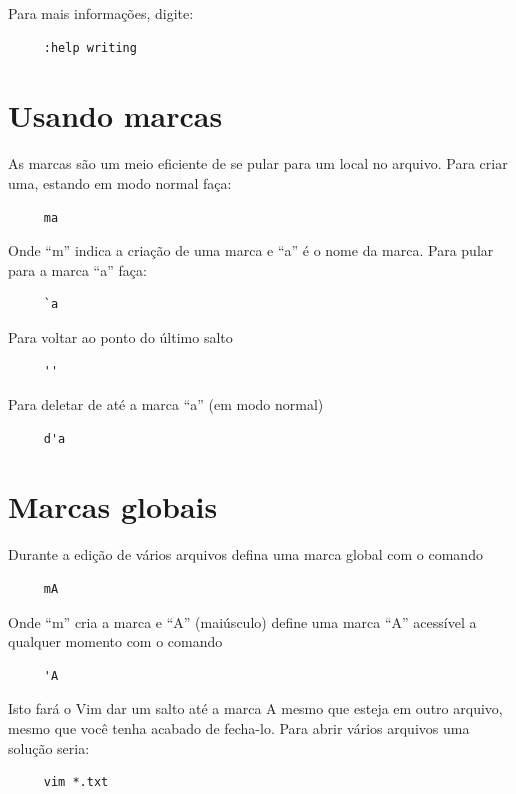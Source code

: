 \documentclass[10pt,a4paper,openany]{book}
\begin{document}
Para mais informações, digite:

\begin{verbatim}
     :help writing
\end{verbatim}

\section{Usando marcas}
\label{sec:Usando marcas}

As marcas são um meio eficiente de se pular para um local no arquivo. Para
criar uma,  estando em modo normal faça:

\begin{verbatim}
     ma
\end{verbatim}

Onde ``m'' indica a criação de uma marca e ``a'' é o nome da marca. Para pular para a marca ``a'' faça:

\begin{verbatim}
     `a
\end{verbatim}

Para voltar ao ponto do último salto

\begin{verbatim}
     ''
\end{verbatim}

Para deletar de até a marca ``a'' (em modo normal)

\begin{verbatim}
     d'a
\end{verbatim}

\section{Marcas globais}
Durante a edição de vários arquivos defina uma marca global com o comando

\begin{verbatim}
     mA
\end{verbatim}

Onde ``m'' cria a marca e ``A'' (maiúsculo) define uma marca ``A'' acessível a qualquer momento com o comando

\begin{verbatim}
     'A
\end{verbatim}

Isto fará o Vim dar um salto até a marca A mesmo que esteja em outro
arquivo, mesmo que você tenha acabado de fecha-lo. Para abrir vários
arquivos uma solução seria:

\begin{verbatim}
     vim *.txt
\end{verbatim}
\end{document}
